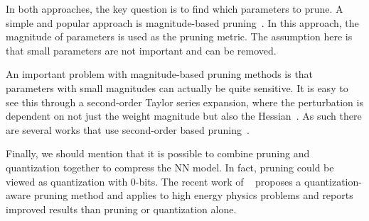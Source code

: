 In both approaches, the key question is to find which parameters to prune.
A simple and popular approach is magnitude-based pruning~\cite{chauvin1989back,hanson1988comparing,mozer1988skeletonization,li2016pruning,he2017channel,liu2017learning,he2019filter,lin2020hrank}.
In this approach, the magnitude of parameters is used as the pruning metric.
The assumption here is that small parameters are not important and can be removed.

An important problem with magnitude-based pruning methods is that parameters with small magnitudes can actually be quite sensitive.
It is easy to see this through a second-order Taylor series expansion, where the perturbation is dependent on not just the weight magnitude but
also the Hessian~\cite{lecun1990optimal}. As such there are several works that use
second-order based pruning~\cite{lecun1990optimal,hassibi1993optimal,hassibi1993second,wang2019eigendamage,yu2021hessian}.

Finally, we should mention that it is possible to 
combine pruning and quantization together to compress the NN model.
In fact, pruning could be viewed as quantization with 0-bits. The recent work
of ~\cite{hawks2021ps} proposes a quantization-aware pruning
method and applies to high energy physics problems and reports
improved results than pruning or quantization alone.


